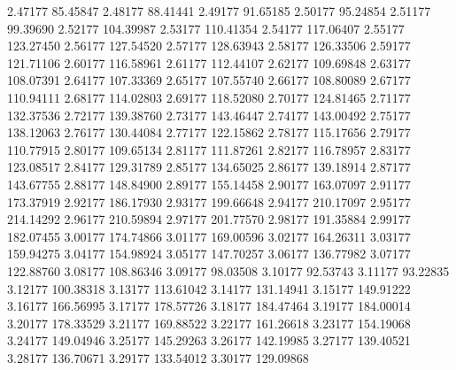       2.47177     85.45847    
      2.48177     88.41441    
      2.49177     91.65185    
      2.50177     95.24854    
      2.51177     99.39690    
      2.52177    104.39987    
      2.53177    110.41354    
      2.54177    117.06407    
      2.55177    123.27450    
      2.56177    127.54520    
      2.57177    128.63943    
      2.58177    126.33506    
      2.59177    121.71106    
      2.60177    116.58961    
      2.61177    112.44107    
      2.62177    109.69848    
      2.63177    108.07391    
      2.64177    107.33369    
      2.65177    107.55740    
      2.66177    108.80089    
      2.67177    110.94111    
      2.68177    114.02803    
      2.69177    118.52080    
      2.70177    124.81465    
      2.71177    132.37536    
      2.72177    139.38760    
      2.73177    143.46447    
      2.74177    143.00492    
      2.75177    138.12063    
      2.76177    130.44084    
      2.77177    122.15862    
      2.78177    115.17656    
      2.79177    110.77915    
      2.80177    109.65134    
      2.81177    111.87261    
      2.82177    116.78957    
      2.83177    123.08517    
      2.84177    129.31789    
      2.85177    134.65025    
      2.86177    139.18914    
      2.87177    143.67755    
      2.88177    148.84900    
      2.89177    155.14458    
      2.90177    163.07097    
      2.91177    173.37919    
      2.92177    186.17930    
      2.93177    199.66648    
      2.94177    210.17097    
      2.95177    214.14292    
      2.96177    210.59894    
      2.97177    201.77570    
      2.98177    191.35884    
      2.99177    182.07455    
      3.00177    174.74866    
      3.01177    169.00596    
      3.02177    164.26311    
      3.03177    159.94275    
      3.04177    154.98924    
      3.05177    147.70257    
      3.06177    136.77982    
      3.07177    122.88760    
      3.08177    108.86346    
      3.09177     98.03508    
      3.10177     92.53743    
      3.11177     93.22835    
      3.12177    100.38318    
      3.13177    113.61042    
      3.14177    131.14941    
      3.15177    149.91222    
      3.16177    166.56995    
      3.17177    178.57726    
      3.18177    184.47464    
      3.19177    184.00014    
      3.20177    178.33529    
      3.21177    169.88522    
      3.22177    161.26618    
      3.23177    154.19068    
      3.24177    149.04946    
      3.25177    145.29263    
      3.26177    142.19985    
      3.27177    139.40521    
      3.28177    136.70671    
      3.29177    133.54012    
      3.30177    129.09868    
